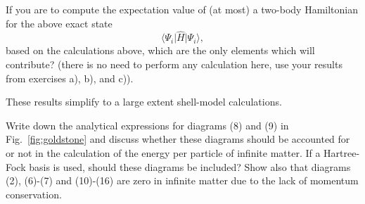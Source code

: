\begin{prob}
\begin{enumerate}
  If you are to compute the expectation value of (at most) a two-body
  Hamiltonian for the above exact state
  \[
  \langle \Psi_i \vert \hat{H} \vert \Psi_i\rangle,
  \]
  based on the calculations above, which are the only elements which
  will contribute?  (there is no need to perform any calculation here,
  use your results from exercises a), b), and c)).

  These results simplify to a large extent shell-model calculations.
  \end{enumerate}
  \end{prob}

  \begin{prob}\label{problem:diagrams}
Write down the analytical expressions for diagrams (8) and (9) in Fig.~\ref{fig:goldstone} and discuss whether these
diagrams should be accounted for or not in the calculation of the energy per particle of infinite matter. 
If a Hartree-Fock basis is used, should these diagrams be included?  
Show also that diagrams (2), (6)-(7) and (10)-(16) are zero in infinite matter due to the lack of momentum conservation. 
\end{prob}

